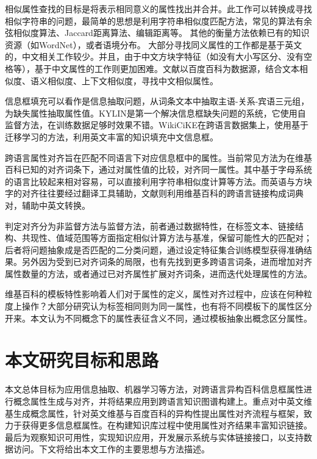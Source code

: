 {\heiti 相似属性查找}的目标是将表示相同意义的属性找出并合并。此工作可以转换成寻找相似字符串的问题，最简单的思想是利用字符串相似度匹配方法，常见的算法有余弦相似度算法、Jaccard距离算法、编辑距离等。
其他的衡量方法依赖已有的知识资源（如WordNet）\cite{yang2005measuring}，或者语境分布\cite{pantel2009web}。
大部分寻找同义属性的工作都是基于英文的，中文相关工作较少。并且，由于中文方块字特征（如没有大小写区分、没有空格等），基于中文属性的工作则更加困难。文献\cite{liu2014extracting}以百度百科为数据源，结合文本相似度、语义相似度、上下文相似度，寻找中文相似属性。

{\heiti 信息框填充}可以看作是信息抽取问题，从词条文本中抽取主语-关系-宾语三元组，为缺失属性抽取属性值。KYLIN\cite{wu2007autonomously}是第一个解决信息框缺失问题的系统，它使用自监督方法，在训练数据足够时效果不错。WikiCiKE\cite{wang2013transfer}在跨语言数据集上，使用基于迁移学习的方法，利用英文丰富的知识填充中文信息框。

{\heiti 跨语言属性对齐}旨在匹配不同语言下对应信息框中的属性。当前常见方法为在维基百科已知的对齐词条下，通过对属性值的比较，对齐同一属性。其中基于字母系统的语言比较起来相对容易，可以直接利用字符串相似度计算等方法\cite{bouma2009cross}。而英语与方块字的对齐往往要经过翻译工具辅助\cite{fu2009cross}，文献\cite{nguyen2011multilingual}则利用维基百科的跨语言链接构成词典对，辅助中英文转换。

判定对齐分为非监督方法与监督方法，前者通过数据特性，在标签文本、链接结构、共现性、值域范围等方面指定相似计算方法与基准，保留可能性大的匹配对\cite{nguyen2011multilingual,lin2011unsupervised}；后者将问题抽象成是否匹配的二分类问题\cite{adar2009information}，通过设定特征集合训练模型获得准确结果。另外因为受到已对齐词条的局限，也有先找到更多跨语言词条，进而增加对齐属性数量的方法\cite{rinser2013cross}，或者通过已对齐属性扩展对齐词条，进而迭代处理属性的方法\cite{nguyen2013slint}。

维基百科的模板特性影响着人们对于属性的定义，属性对齐过程中，应该在何种粒度上操作？大部分研究认为标签相同则为同一属性\cite{adar2009information,nguyen2011multilingual}，也有将不同模板下的属性区分开来\cite{bouma2009cross}。本文认为不同概念下的属性表征含义不同，通过模板抽象出概念区分属性。

\section{本文研究目标和思路}
本文总体目标为应用信息抽取、机器学习等方法，对跨语言异构百科信息框属性进行概念属性生成与对齐，并将结果应用到跨语言知识图谱构建上。重点对中英文维基生成概念属性，针对英文维基与百度百科的异构性提出属性对齐流程与框架，致力于获得更多信息框属性。在构建知识库过程中使用属性对齐结果丰富知识链接。最后为观察知识可用性，实现知识应用，开发展示系统与实体链接接口，以支持数据访问。下文将给出本文工作的主要思想与方法描述。

